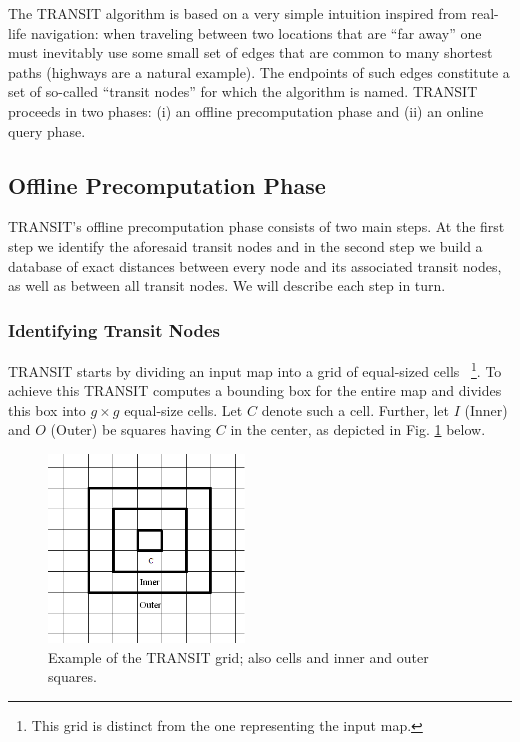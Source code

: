 \documentclass[runningheads,a4paper]{llncs}
\begin{document}
The TRANSIT algorithm is based on a very simple intuition inspired from real-life navigation: when traveling
between two locations that are ``far away'' one must inevitably use some small set of edges that
are common to many shortest paths (highways are a natural example).
The endpoints of such edges constitute a set of so-called ``transit nodes'' for which the algorithm is named.
TRANSIT proceeds in two phases: (i) an offline precomputation phase and (ii) an online query phase.

\subsection {Offline Precomputation Phase}\label{sub:precomputation}
TRANSIT's offline precomputation phase consists of two main steps. At the first step we identify the aforesaid transit nodes
and in the second step we build a database of exact distances between every node and its associated transit nodes, as well as between all transit nodes.
We will describe each step in turn.

\subsubsection{Identifying Transit Nodes}\label{sub:determine}
TRANSIT starts by dividing an input map into a grid of equal-sized cells~
\footnote{ This grid is distinct from the one representing the input map.}.
To achieve this TRANSIT computes a bounding box for the entire map and divides this box
into $g \times g$ equal-size cells. Let $C$ denote such a cell. Further, let $I$ (Inner) and $O$ (Outer)
be squares having $C$ in the center, as depicted in Fig. \ref{fig:example} below.

\begin{figure}[H]
\centering
\includegraphics[height=5cm]{transit_example3.PNG}
\caption{Example of the TRANSIT grid; also cells and inner and outer squares. }
\label{fig:example}
\end{figure}
\end{document}
